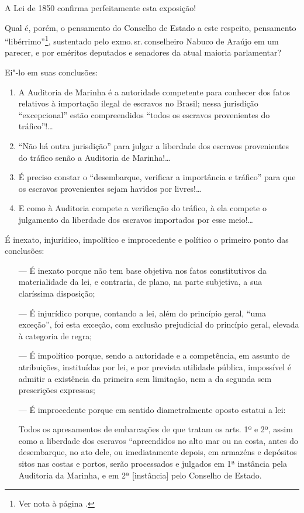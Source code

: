 A Lei de 1850 confirma perfeitamente esta exposição!

\asterisc

Qual é, porém, o pensamento do Conselho de Estado a este respeito,
pensamento ``libérrimo''\footnote{Ver nota à página \pageref{liberrimo}.}, sustentado pelo exmo.\,sr.\,conselheiro Nabuco de Araújo em um parecer, e por eméritos deputados e
senadores da atual maioria parlamentar?

Ei"-lo em suas conclusões:

\begin{enumerate}[label=\arabic*º]
\item A Auditoria de Marinha é a autoridade competente para conhecer dos
fatos relativos à importação ilegal de escravos no Brasil; nessa
jurisdição ``excepcional'' estão compreendidos ``todos os escravos
provenientes do tráfico''!\ldots{}

\item ``Não há outra jurisdição'' para julgar a liberdade dos escravos
provenientes do tráfico senão a Auditoria de Marinha!\ldots{}

\item É preciso constar o ``desembarque, verificar a importância e tráfico''
para que os escravos provenientes sejam havidos por livres!\ldots{}

\item E como à Auditoria compete a verificação do tráfico, à ela compete o
julgamento da liberdade dos escravos importados por esse meio!\ldots{}
\end{enumerate}

É inexato, injurídico, impolítico e improcedente e político o primeiro
ponto das conclusões:

\begin{itemize}
\item[---] É inexato porque não tem base objetiva nos fatos constitutivos da
materialidade da lei, e contraria, de plano, na parte subjetiva, a sua
claríssima disposição;

\item[---] É injurídico porque, contando a lei, além do princípio geral, ``uma
exceção'', foi esta exceção, com exclusão prejudicial do princípio geral,
elevada à categoria de regra;

\item[---] É impolítico porque, sendo a autoridade e a competência, em assunto
de atribuições, instituídas por lei, e por prevista utilidade pública,
impossível é admitir a existência da primeira sem limitação, nem a da
segunda sem prescrições expressas;

\item[---] É improcedente porque em sentido diametralmente oposto estatui a
lei:

Todos os apresamentos de embarcações de que tratam os arts. 1º e 2º,
assim como a liberdade dos escravos ``apreendidos no alto mar ou na
costa, antes do desembarque, no ato dele, ou imediatamente depois, em
armazéns e depósitos sitos nas costas e portos, serão processados e
julgados em 1ª instância pela Auditoria da Marinha, e em 2ª
{[}instância{]} pelo Conselho de Estado.
\end{itemize}

